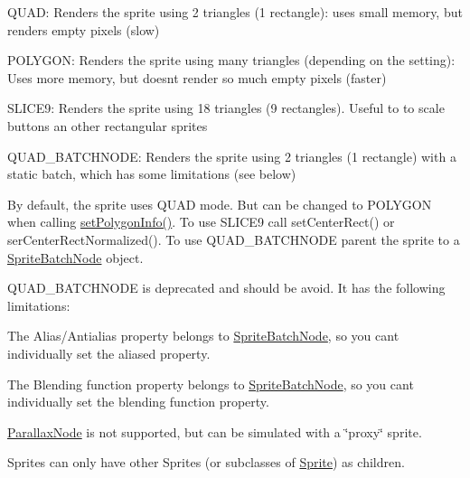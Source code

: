 \begin{DoxyItemize}
\item {\ttfamily Q\+U\+AD}\+: Renders the sprite using 2 triangles (1 rectangle)\+: uses small memory, but renders empty pixels (slow)
\item {\ttfamily P\+O\+L\+Y\+G\+ON}\+: Renders the sprite using many triangles (depending on the setting)\+: Uses more memory, but doesn\textquotesingle{}t render so much empty pixels (faster)
\item {\ttfamily S\+L\+I\+C\+E9}\+: Renders the sprite using 18 triangles (9 rectangles). Useful to to scale buttons an other rectangular sprites
\item {\ttfamily Q\+U\+A\+D\+\_\+\+B\+A\+T\+C\+H\+N\+O\+DE}\+: Renders the sprite using 2 triangles (1 rectangle) with a static batch, which has some limitations (see below)
\end{DoxyItemize}

By default, the sprite uses {\ttfamily Q\+U\+AD} mode. But can be changed to {\ttfamily P\+O\+L\+Y\+G\+ON} when calling {\ttfamily \hyperlink{classSprite_a2ab8f707e76545845606c8de023d4f91}{set\+Polygon\+Info()}}. To use {\ttfamily S\+L\+I\+C\+E9} call {\ttfamily set\+Center\+Rect()} or {\ttfamily ser\+Center\+Rect\+Normalized()}. To use {\ttfamily Q\+U\+A\+D\+\_\+\+B\+A\+T\+C\+H\+N\+O\+DE} parent the sprite to a {\ttfamily \hyperlink{classSpriteBatchNode}{Sprite\+Batch\+Node}} object.

{\ttfamily Q\+U\+A\+D\+\_\+\+B\+A\+T\+C\+H\+N\+O\+DE} is deprecated and should be avoid. It has the following limitations\+:


\begin{DoxyItemize}
\item The Alias/\+Antialias property belongs to {\ttfamily \hyperlink{classSpriteBatchNode}{Sprite\+Batch\+Node}}, so you can\textquotesingle{}t individually set the aliased property.
\item The Blending function property belongs to {\ttfamily \hyperlink{classSpriteBatchNode}{Sprite\+Batch\+Node}}, so you can\textquotesingle{}t individually set the blending function property.
\item {\ttfamily \hyperlink{classParallaxNode}{Parallax\+Node}} is not supported, but can be simulated with a \char`\"{}proxy\char`\"{} sprite.
\item Sprites can only have other Sprites (or subclasses of \hyperlink{classSprite}{Sprite}) as children.
\end{DoxyItemize}

